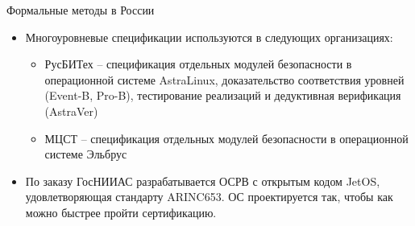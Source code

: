 \documentclass[hyperref={unicode=true}]{beamer}
\begin{document}
    \begin{frame}{Формальные методы в России}
    \begin{itemize}
    \item
    Многоуровневые спецификации используются в следующих
    организациях:
        \begin{itemize}
        \item РусБИТех -- спецификация отдельных модулей
        безопасности в операционной системе AstraLinux,
        доказательство соответствия уровней (Event-B, Pro-B),
        тестирование
        реализаций и дедуктивная верификация (AstraVer)
        \item МЦСТ -- спецификация отдельных модулей
        безопасности в операционной системе Эльбрус
        \end{itemize}
    \item
    По заказу ГосНИИАС разрабатывается ОСРВ с открытым
    кодом JetOS, удовлетворяющая стандарту ARINC653. ОС
    проектируется так, чтобы как можно быстрее пройти
    сертификацию.
    \end{itemize}
    \end{frame}
\end{document}
